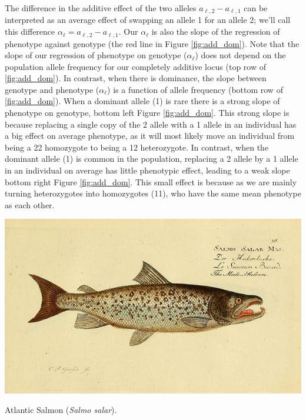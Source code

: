 The difference in the additive effect of the two alleles $a_{\ell, 2}-a_{\ell,
1}$ can be interpreted as an average effect of swapping an allele 1 for an
allele 2; we'll call this difference $\alpha_{\ell}=a_{\ell, 2}-a_{\ell, 1}$.
Our $\alpha_{\ell}$ is also the slope of the regression of phenotype against
genotype (the red line in Figure \ref{fig:add_dom}). Note that the slope of
our regression of phenotype on genotype ($\alpha_{\ell}$)  does not depend on the population
allele frequency for our completely additive locus (top row of
\ref{fig:add_dom}). In contrast, when there is dominance, the slope between
genotype and phenotype ($\alpha_{\ell}$) is a function of allele frequency
(bottom row of \ref{fig:add_dom}). When a dominant allele (1) is rare there is
a strong slope of phenotype on genotype, bottom left Figure \ref{fig:add_dom}.
This strong slope is because replacing a single copy of the 2 allele with a 1
allele in an individual has a big effect on average phenotype, as it will most
likely move an individual from being a 22 homozygote to being a 12
heterozygote. In contrast, when the dominant allele (1) is common in the
population, replacing a 2 allele by a 1 allele in an individual on average has
little phenotypic effect, leading to a weak slope bottom right Figure \ref{fig:add_dom}. This small effect is because as we are mainly turning
heterozygotes into homozygotes (11), who have the same mean phenotype as each other.  \\


\begin{marginfigure}
\begin{center}
\includegraphics[width=\textwidth]{illustration_images/Quant_gen/Salmon/6918368208_5353868a88_z.jpg}
\end{center}
\caption{Atlantic Salmon ({\it Salmo salar}). } \label{fig:Salmon}
\end{marginfigure}


